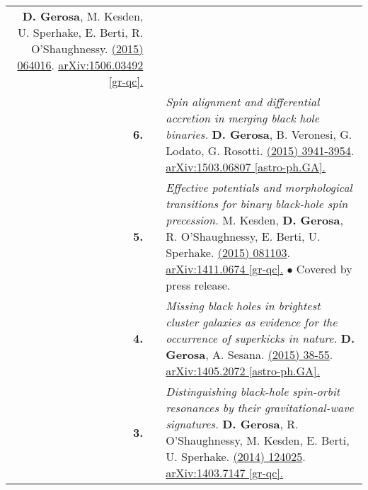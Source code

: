 {\begin{longtable}{rp{0.3cm}p{15.8cm}}
\newline{}
\textbf{D. Gerosa}, M. Kesden, U. Sperhake, E. Berti, R. O'Shaughnessy.
\newline{}
\href{http://dx.doi.org/10.1103/PhysRevD.92.064016}{\prd 92 (2015) 064016}. \href{https://arxiv.org/abs/1506.03492}{arXiv:1506.03492 [gr-qc].}
\vspace{0.09cm}\\
%
\textbf{6.} & & \textit{Spin alignment and differential accretion in merging black hole binaries.}
\newline{}
\textbf{D. Gerosa}, B. Veronesi, G. Lodato, G. Rosotti.
\newline{}
\href{http://dx.doi.org/10.1093/mnras/stv1214}{\mnras 451 (2015) 3941-3954}. \href{https://arxiv.org/abs/1503.06807}{arXiv:1503.06807 [astro-ph.GA].}
\vspace{0.09cm}\\
%
\textbf{5.} & & \textit{Effective potentials and morphological transitions for binary black-hole spin precession.}
\newline{}
M. Kesden, \textbf{D. Gerosa}, R. O'Shaughnessy, E. Berti, U. Sperhake.
\newline{}
\href{http://dx.doi.org/10.1103/PhysRevLett.114.081103}{\prl 114 (2015) 081103}. \href{https://arxiv.org/abs/1411.0674}{arXiv:1411.0674 [gr-qc].}
\newline{}
\textcolor{color1}{$\bullet$} Covered by press release.
\vspace{0.09cm}\\
%
\textbf{4.} & & \textit{Missing black holes in brightest cluster galaxies as evidence for the occurrence of superkicks in nature.}
\newline{}
\textbf{D. Gerosa}, A. Sesana.
\newline{}
\href{http://dx.doi.org/10.1093/mnras/stu2049}{\mnras 446 (2015) 38-55}. \href{https://arxiv.org/abs/1405.2072}{arXiv:1405.2072 [astro-ph.GA].}
\vspace{0.09cm}\\
%
\textbf{3.} & & \textit{Distinguishing black-hole spin-orbit resonances by their gravitational-wave signatures.}
\newline{}
\textbf{D. Gerosa}, R. O'Shaughnessy, M. Kesden, E. Berti, U. Sperhake.
\newline{}
\href{http://dx.doi.org/10.1103/PhysRevD.89.124025}{\prd 89 (2014) 124025}. \href{https://arxiv.org/abs/1403.7147}{arXiv:1403.7147 [gr-qc].}
\vspace{0.09cm}\\

\end{longtable}}
